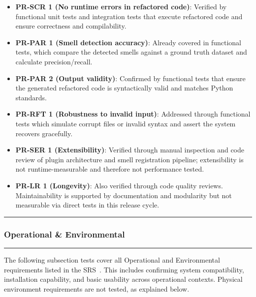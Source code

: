 \documentclass[12pt, titlepage]{article}
\newcommand{\colorrule}{\textcolor{BlueViolet}{\rule{\linewidth}{2pt}}}
\begin{document}
\begin{itemize}
  \item \textbf{PR-SCR 1 (No runtime errors in refactored code)}: Verified by functional unit tests and integration tests that execute refactored code and ensure correctness and compilability.
  
  \item \textbf{PR-PAR 1 (Smell detection accuracy)}: Already covered in functional tests, which compare the detected smells against a ground truth dataset and calculate precision/recall.

  \item \textbf{PR-PAR 2 (Output validity)}: Confirmed by functional tests that ensure the generated refactored code is syntactically valid and matches Python standards.

  \item \textbf{PR-RFT 1 (Robustness to invalid input)}: Addressed through functional tests which simulate corrupt files or invalid syntax and assert the system recovers gracefully.

  \item \textbf{PR-SER 1 (Extensibility)}: Verified through manual inspection and code review of plugin architecture and smell registration pipeline; extensibility is not runtime-measurable and therefore not performance tested.

  \item \textbf{PR-LR 1 (Longevity)}: Also verified through code quality reviews. Maintainability is supported by documentation and modularity but not measurable via direct tests in this release cycle.
\end{itemize}

  \noindent
  \colorrule

\subsubsection{Operational \& Environmental}
\colorrule

\medskip

\noindent
The following subsection tests cover all Operational and Environmental requirements listed in the SRS~\cite{SRS}. This includes confirming system compatibility, installation capability, and basic usability across operational contexts. Physical environment requirements are not tested, as explained below.
\end{document}
